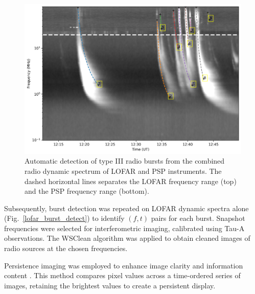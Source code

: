 \begin{figure}
	\centering
	\includegraphics[width=0.8\hsize]{chapter3/figs/auto_detect_typeIIIs.png}
	\caption{Automatic detection of type III radio bursts from the combined radio dynamic spectrum of LOFAR and PSP instruments. The dashed horizontal lines separates the LOFAR frequency range (top) and the PSP frequency range (bottom).}
	\label{lofar_psp_burst_detect}
\end{figure}

Subsequently, burst detection was repeated on LOFAR dynamic spectra alone (Fig.~\ref{lofar_burst_detect}) to identify $(f,t)$ pairs for each burst. Snapshot frequencies were selected for interferometric imaging, calibrated using Tau-A observations. The WSClean algorithm \citep{wsclean_2014} was applied to obtain cleaned images of radio sources at the chosen frequencies.

Persistence imaging was employed to enhance image clarity and information content \citep{thompson_2016}. This method compares pixel values across a time-ordered series of images, retaining the brightest values to create a persistent display.

